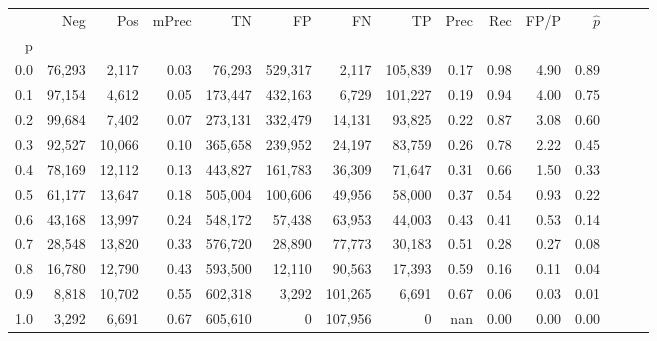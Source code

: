 \begin{tabular}{rrrrrrrrrrrrrrr}
\toprule
{} &     Neg &     Pos & mPrec &       TN &       FP &       FN &       TP &  Prec &   Rec &  FP/P & $\hat{p}$ \\
p   &         &         &       &          &          &          &          &       &       &       &           \\
\midrule
0.0 &  76,293 &   2,117 &  0.03 &   76,293 &  529,317 &    2,117 &  105,839 &  0.17 &  0.98 &  4.90 &      0.89 \\
0.1 &  97,154 &   4,612 &  0.05 &  173,447 &  432,163 &    6,729 &  101,227 &  0.19 &  0.94 &  4.00 &      0.75 \\
0.2 &  99,684 &   7,402 &  0.07 &  273,131 &  332,479 &   14,131 &   93,825 &  0.22 &  0.87 &  3.08 &      0.60 \\
0.3 &  92,527 &  10,066 &  0.10 &  365,658 &  239,952 &   24,197 &   83,759 &  0.26 &  0.78 &  2.22 &      0.45 \\
0.4 &  78,169 &  12,112 &  0.13 &  443,827 &  161,783 &   36,309 &   71,647 &  0.31 &  0.66 &  1.50 &      0.33 \\
0.5 &  61,177 &  13,647 &  0.18 &  505,004 &  100,606 &   49,956 &   58,000 &  0.37 &  0.54 &  0.93 &      0.22 \\
0.6 &  43,168 &  13,997 &  0.24 &  548,172 &   57,438 &   63,953 &   44,003 &  0.43 &  0.41 &  0.53 &      0.14 \\
0.7 &  28,548 &  13,820 &  0.33 &  576,720 &   28,890 &   77,773 &   30,183 &  0.51 &  0.28 &  0.27 &      0.08 \\
0.8 &  16,780 &  12,790 &  0.43 &  593,500 &   12,110 &   90,563 &   17,393 &  0.59 &  0.16 &  0.11 &      0.04 \\
0.9 &   8,818 &  10,702 &  0.55 &  602,318 &    3,292 &  101,265 &    6,691 &  0.67 &  0.06 &  0.03 &      0.01 \\
1.0 &   3,292 &   6,691 &  0.67 &  605,610 &        0 &  107,956 &        0 &   nan &  0.00 &  0.00 &      0.00 \\
\bottomrule
\end{tabular}
